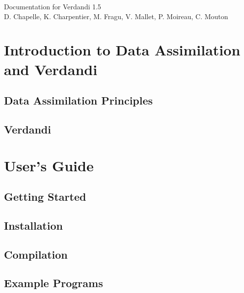 \documentclass{book}
\begin{document}
\hypersetup{pageanchor=false,citecolor=blue}
\begin{titlepage}
\vspace*{7cm}
\begin{center}
{\Large Documentation for Verdandi 1.5}\\
\vspace*{1cm}
{\large D. Chapelle, K. Charpentier, M. Fragu, V. Mallet, P. Moireau, C. Mouton}\\
\end{center}
\end{titlepage}
\clearemptydoublepage
{}
\tableofcontents
\clearemptydoublepage
{}
\hypersetup{pageanchor=true,citecolor=blue}
\part{Introduction to Data Assimilation and Verdandi}
\chapter{Data Assimilation Principles}

\chapter{Verdandi}
\label{index}\hypertarget{index}{}
\part{User's Guide}
\chapter{Getting Started}
\label{getting_started}
\hypertarget{getting_started}{}

\chapter{Installation}
\label{installation}
\hypertarget{installation}{}

\chapter{Compilation}
\label{compilation}
\hypertarget{compilation}{}

\chapter{Example Programs}
\label{example_programs}
\hypertarget{example_programs}{}

\end{document}
